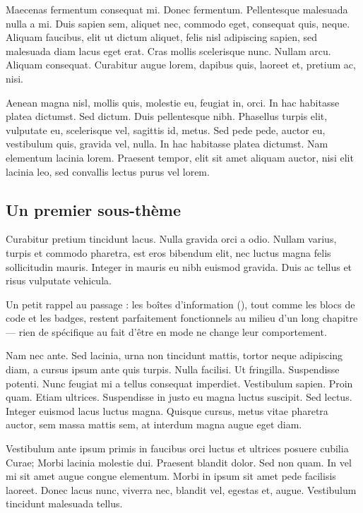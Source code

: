 \documentclass[theme=pringlea]{myrtillebook}
\begin{document}
Maecenas fermentum consequat mi. Donec fermentum. Pellentesque malesuada nulla a mi. Duis sapien sem, aliquet nec, commodo eget, consequat quis, neque. Aliquam faucibus, elit ut dictum aliquet, felis nisl adipiscing sapien, sed malesuada diam lacus eget erat. Cras mollis scelerisque nunc. Nullam arcu. Aliquam consequat. Curabitur augue lorem, dapibus quis, laoreet et, pretium ac, nisi.

Aenean magna nisl, mollis quis, molestie eu, feugiat in, orci. In hac habitasse platea dictumst. Sed dictum. Duis pellentesque nibh. Phasellus turpis elit, vulputate eu, scelerisque vel, sagittis id, metus. Sed pede pede, auctor eu, vestibulum quis, gravida vel, nulla. In hac habitasse platea dictumst. Nam elementum lacinia lorem. Praesent tempor, elit sit amet aliquam auctor, nisi elit lacinia leo, sed convallis lectus purus vel lorem.

\subsection{Un premier sous-thème}

Curabitur pretium tincidunt lacus. Nulla gravida orci a odio. Nullam varius, turpis et commodo pharetra, est eros bibendum elit, nec luctus magna felis sollicitudin mauris. Integer in mauris eu nibh euismod gravida. Duis ac tellus et risus vulputate vehicula.

\begin{infobox}
Un petit rappel au passage : les boîtes d'information (), tout comme les blocs de code et les badges, restent parfaitement fonctionnels au milieu d'un long chapitre — rien de spécifique au fait d'être en mode  ne change leur comportement.
\end{infobox}

Nam nec ante. Sed lacinia, urna non tincidunt mattis, tortor neque adipiscing diam, a cursus ipsum ante quis turpis. Nulla facilisi. Ut fringilla. Suspendisse potenti. Nunc feugiat mi a tellus consequat imperdiet. Vestibulum sapien. Proin quam. Etiam ultrices. Suspendisse in justo eu magna luctus suscipit. Sed lectus. Integer euismod lacus luctus magna. Quisque cursus, metus vitae pharetra auctor, sem massa mattis sem, at interdum magna augue eget diam.

Vestibulum ante ipsum primis in faucibus orci luctus et ultrices posuere cubilia Curae; Morbi lacinia molestie dui. Praesent blandit dolor. Sed non quam. In vel mi sit amet augue congue elementum. Morbi in ipsum sit amet pede facilisis laoreet. Donec lacus nunc, viverra nec, blandit vel, egestas et, augue. Vestibulum tincidunt malesuada tellus.
\end{document}
